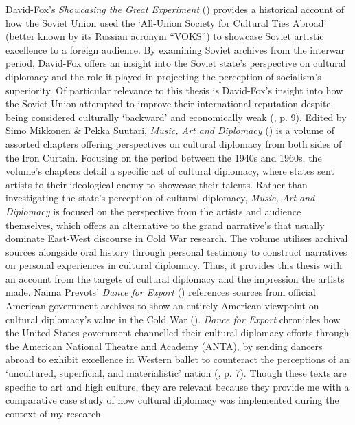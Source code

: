 David-Fox’s \textit{Showcasing the Great Experiment} (\citeyear{david-fox2011}) provides a historical account of how the Soviet Union used the ‘All-Union Society for Cultural Ties Abroad’ (better known by its Russian acronym “VOKS”) to showcase Soviet artistic excellence to a foreign audience. By examining Soviet archives from the interwar period, David-Fox offers an insight into the Soviet state’s perspective on cultural diplomacy and the role it played in projecting the perception of socialism’s superiority. Of particular relevance to this thesis is David-Fox’s insight into how the Soviet Union attempted to improve their international reputation despite being considered culturally ‘backward’ and economically weak (\cite{david-fox2011}, p. 9). Edited by Simo Mikkonen \& Pekka Suutari, \textit{Music, Art and Diplomacy} (\citeyear{mikkonensuutari2016}) is a volume of assorted chapters offering perspectives on cultural diplomacy from both sides of the Iron Curtain. Focusing on the period between the 1940s and 1960s, the volume’s chapters detail a specific act of cultural diplomacy, where states sent artists to their ideological enemy to showcase their talents. Rather than investigating the state’s perception of cultural diplomacy, \textit{Music, Art and Diplomacy} is focused on the perspective from the artists and audience themselves, which offers an alternative to the grand narrative’s that usually dominate East-West discourse in Cold War research. The volume utilises archival sources alongside oral history through personal testimony to construct narratives on personal experiences in cultural diplomacy. Thus, it provides this thesis with an account from the targets of cultural diplomacy and the impression the artists made. Naima Prevots’ \textit{Dance for Export} (\citeyear{prevots1998}) references sources from official American government archives to show an entirely American viewpoint on cultural diplomacy’s value in the Cold War (\cite{prevots1998}). \textit{Dance for Export} chronicles how the United States government channelled their cultural diplomacy efforts through the American National Theatre and Academy (ANTA), by sending dancers abroad to exhibit excellence in Western ballet to counteract the perceptions of an ‘uncultured, superficial, and materialistic’ nation (\cite{prevots1998}, p. 7). Though these texts are specific to art and high culture, they are relevant because they provide me with a comparative case study of how cultural diplomacy was implemented during the context of my research.

